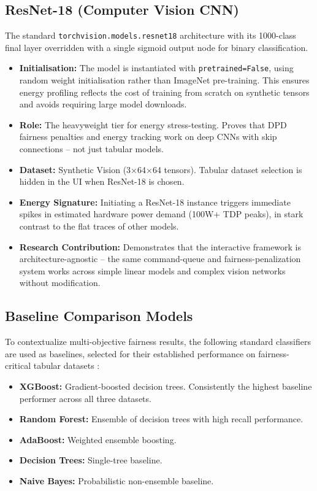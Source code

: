 \documentclass[12pt,a4paper]{article}
\begin{document}
\subsection{ResNet-18 (Computer Vision CNN)}

The standard \texttt{torchvision.models.resnet18} architecture with its 1000-class final layer overridden with a single sigmoid output node for binary classification.

\begin{itemize}
    \item \textbf{Initialisation:} The model is instantiated with \texttt{pretrained=False}, using random weight initialisation rather than ImageNet pre-training. This ensures energy profiling reflects the cost of training from scratch on synthetic tensors and avoids requiring large model downloads.
    \item \textbf{Role:} The heavyweight tier for energy stress-testing. Proves that DPD fairness penalties and energy tracking work on deep CNNs with skip connections -- not just tabular models.
    \item \textbf{Dataset:} Synthetic Vision (3$\times$64$\times$64 tensors). Tabular dataset selection is hidden in the UI when ResNet-18 is chosen.
    \item \textbf{Energy Signature:} Initiating a ResNet-18 instance triggers immediate spikes in estimated hardware power demand (100W+ TDP peaks), in stark contrast to the flat traces of other models.
    \item \textbf{Research Contribution:} Demonstrates that the interactive framework is architecture-agnostic -- the same command-queue and fairness-penalization system works across simple linear models and complex vision networks without modification.
\end{itemize}

\subsection{Baseline Comparison Models}

To contextualize multi-objective fairness results, the following standard classifiers are used as baselines, selected for their established performance on fairness-critical tabular datasets \cite{nagpal2024multiobj}:

\begin{itemize}
    \item \textbf{XGBoost:} Gradient-boosted decision trees. Consistently the highest baseline performer across all three datasets.
    \item \textbf{Random Forest:} Ensemble of decision trees with high recall performance.
    \item \textbf{AdaBoost:} Weighted ensemble boosting.
    \item \textbf{Decision Trees:} Single-tree baseline.
    \item \textbf{Naive Bayes:} Probabilistic non-ensemble baseline.
\end{itemize}
\end{document}
